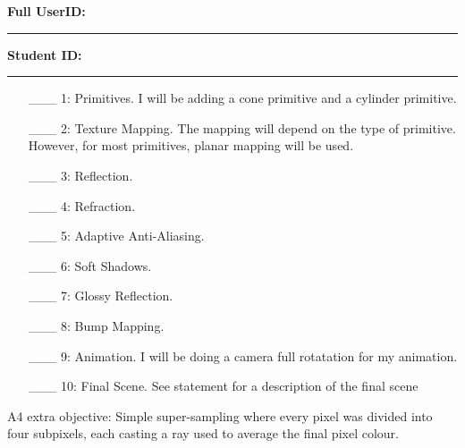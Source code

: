 \documentclass {article}
\begin{document}

{\hfill{\bf Full UserID:\rule{2in}{.1mm}}\hfill{\bf Student ID:\rule{2in}{.1mm}}\hfill}

\begin{enumerate}
     \item[\_\_\_ 1:]  Primitives. I will be adding a cone primitive and a cylinder primitive.

     \item[\_\_\_ 2:]  Texture Mapping. The mapping will depend on the type of primitive. However, for most primitives, planar mapping will be used. 

     \item[\_\_\_ 3:]  Reflection.

     \item[\_\_\_ 4:]  Refraction.

     \item[\_\_\_ 5:]  Adaptive Anti-Aliasing. 

     \item[\_\_\_ 6:]  Soft Shadows.

     \item[\_\_\_ 7:]  Glossy Reflection.

     \item[\_\_\_ 8:]  Bump Mapping.
     
     \item[\_\_\_ 9:]  Animation. I will be doing a camera full rotatation for my animation.

     \item[\_\_\_ 10:]  Final Scene. See statement for a description of the final scene
\end{enumerate}

A4 extra objective: Simple super-sampling where every pixel was divided into four subpixels, each casting a ray used to average the final pixel colour.
\end{document}
